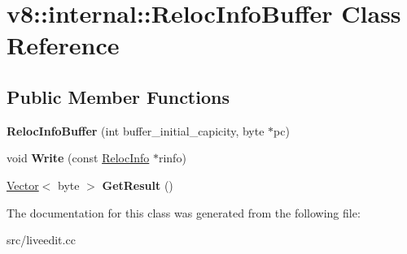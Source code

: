 \hypertarget{classv8_1_1internal_1_1_reloc_info_buffer}{}\section{v8\+:\+:internal\+:\+:Reloc\+Info\+Buffer Class Reference}
\label{classv8_1_1internal_1_1_reloc_info_buffer}
\subsection*{Public Member Functions}
\begin{DoxyCompactItemize}
\item 
\hypertarget{classv8_1_1internal_1_1_reloc_info_buffer_a2bb2110b0dd9010980068794f1254a1b}{}{\bfseries Reloc\+Info\+Buffer} (int buffer\+\_\+initial\+\_\+capicity, byte $\ast$pc)\label{classv8_1_1internal_1_1_reloc_info_buffer_a2bb2110b0dd9010980068794f1254a1b}

\item 
\hypertarget{classv8_1_1internal_1_1_reloc_info_buffer_a1a204335e2833c88220db6639aadcae6}{}void {\bfseries Write} (const \hyperlink{classv8_1_1internal_1_1_reloc_info}{Reloc\+Info} $\ast$rinfo)\label{classv8_1_1internal_1_1_reloc_info_buffer_a1a204335e2833c88220db6639aadcae6}

\item 
\hypertarget{classv8_1_1internal_1_1_reloc_info_buffer_a6a45a162563bc5d00f1533d89a70d04e}{}\hyperlink{classv8_1_1internal_1_1_vector}{Vector}$<$ byte $>$ {\bfseries Get\+Result} ()\label{classv8_1_1internal_1_1_reloc_info_buffer_a6a45a162563bc5d00f1533d89a70d04e}

\end{DoxyCompactItemize}


The documentation for this class was generated from the following file\+:\begin{DoxyCompactItemize}
\item 
src/liveedit.\+cc\end{DoxyCompactItemize}
